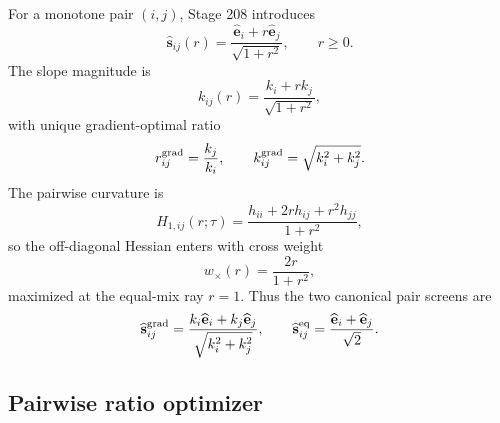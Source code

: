 For a monotone pair \((i,j)\), Stage 208 introduces
\begin{equation}
\label{eq:part06-pairwise-cone}
\widehat{\mathbf s}_{ij}(r)=
\frac{\widehat{\mathbf e}_i+r\widehat{\mathbf e}_j}{\sqrt{1+r^2}},
\qquad
r\ge0.
\end{equation}
The slope magnitude is
\begin{equation}
\label{eq:part06-pairwise-slope}
k_{ij}(r)=\frac{k_i+rk_j}{\sqrt{1+r^2}},
\end{equation}
with unique gradient-optimal ratio
\begin{equation}
\label{eq:part06-pairwise-gradient-ratio}
r_{ij}^{\rm grad}=\frac{k_j}{k_i},
\qquad
k_{ij}^{\rm grad}=\sqrt{k_i^2+k_j^2}.
\end{equation}
The pairwise curvature is
\begin{equation}
\label{eq:part06-pairwise-curvature}
H_{1,ij}(r;\tau)
=
\frac{h_{ii}+2rh_{ij}+r^2h_{jj}}{1+r^2},
\end{equation}
so the off-diagonal Hessian enters with cross weight
\begin{equation}
\label{eq:part06-pairwise-cross-weight}
w_\times(r)=\frac{2r}{1+r^2},
\end{equation}
maximized at the equal-mix ray \(r=1\).  Thus the two canonical pair screens are
\begin{equation}
\label{eq:part06-pairwise-canonical-screens}
\widehat{\mathbf s}_{ij}^{\rm grad}
=\frac{k_i\widehat{\mathbf e}_i+k_j\widehat{\mathbf e}_j}{\sqrt{k_i^2+k_j^2}},
\qquad
\widehat{\mathbf s}_{ij}^{\rm eq}
=\frac{\widehat{\mathbf e}_i+\widehat{\mathbf e}_j}{\sqrt2}.
\end{equation}

\subsection{Pairwise ratio optimizer}
\label{subsec:part06-pairwise-ratio-optimizer}

